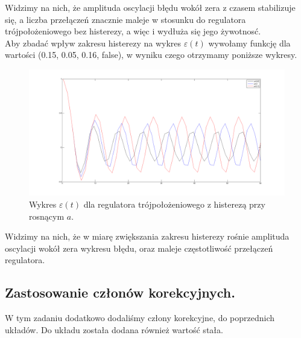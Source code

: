 \documentclass[a4paper,10pt]{article}
\begin{document}
Widzimy na nich, że amplituda oscylacji błędu wokół zera z czasem stabilizuje się, a liczba przełączeń znacznie maleje w stosunku do regulatora trójpołożeniowego bez histerezy, a więc i wydłuża się jego żywotnosć. \\
Aby zbadać wpływ zakresu histerezy na wykres $\varepsilon(t)$ wywołamy funkcję dla wartości (0.15, 0.05, 0.16, false), w wyniku czego otrzymamy poniższe wykresy.

\begin{figure}[!h]
    \centering
	\includegraphics[width=120mm]{CW3-trojpolozeniowy-e-n015.png}
	\caption{Wykres $\varepsilon(t)$ dla regulatora trójpołożeniowego z histerezą przy rosnącym $a$.}
    \label{fig:Rysunek}
\end{figure}

\newpage Widzimy na nich, że w miarę zwiększania zakresu histerezy rośnie amplituda oscylacji wokół zera wykresu błędu, oraz maleje częstotliwość przełączeń regulatora.

\newpage
\subsection{Zastosowanie członów korekcyjnych.}\label{sec:zad2}
W tym zadaniu dodatkowo dodaliśmy człony korekcyjne, do poprzednich układów. Do układu została dodana również wartość stała.
\end{document}
